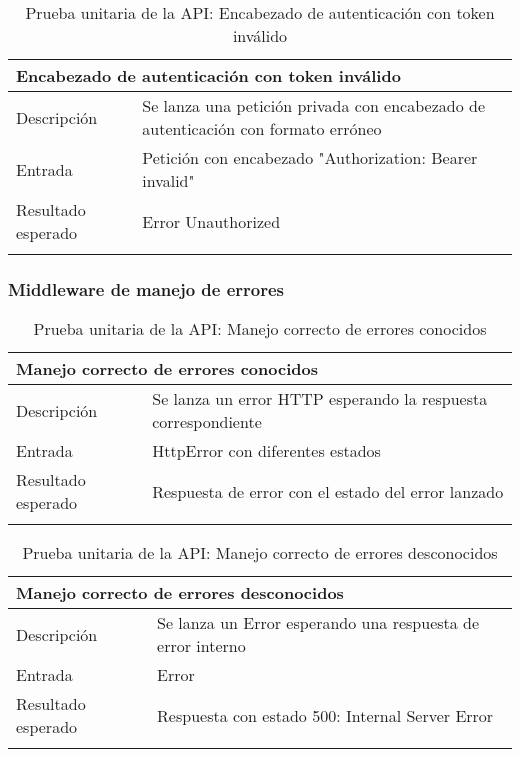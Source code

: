 \begin{longtable}{|p{} p{}|}
    \hline
    \multicolumn{2}{|l|}{\textbf{Encabezado de autenticación con token inválido}} \\ \hline 
    Descripción                 & Se lanza una petición privada con encabezado de autenticación con formato erróneo \\ \hline
    Entrada                     & Petición con encabezado "Authorization: Bearer invalid" \\ \hline
    Resultado esperado          & Error Unauthorized \\ \hline
    \caption{Prueba unitaria de la API: Encabezado de autenticación con token inválido}
    \label{cp:u:api:encabezado_token_invalido}
\end{longtable}

\vspace{-20pt}
\subsubsection{Middleware de manejo de errores}

\begin{longtable}{|p{} p{}|}
    \hline
    \multicolumn{2}{|l|}{\textbf{Manejo correcto de errores conocidos}} \\ \hline 
    Descripción                 & Se lanza un error HTTP esperando la respuesta correspondiente \\ \hline
    Entrada                     & HttpError con diferentes estados \\ \hline
    Resultado esperado          & Respuesta de error con el estado del error lanzado \\ \hline
    \caption{Prueba unitaria de la API: Manejo correcto de errores conocidos}
    \label{cp:u:api:manejo_error_correcto}
\end{longtable}

\vspace{-15pt}
\begin{longtable}{|p{} p{}|}
    \hline
    \multicolumn{2}{|l|}{\textbf{Manejo correcto de errores desconocidos}} \\ \hline 
    Descripción                 & Se lanza un Error esperando una respuesta de error interno \\ \hline
    Entrada                     & Error \\ \hline
    Resultado esperado          & Respuesta con estado 500: Internal Server Error \\ \hline
    \caption{Prueba unitaria de la API: Manejo correcto de errores desconocidos}
    \label{cp:u:api:manejo_correcto_desconocido}
\end{longtable}

